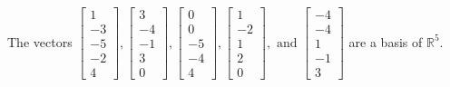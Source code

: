\begin{exercise}
\begin{exerciseStatement}
  \end{exerciseStatement}
  \begin{exerciseAnswer}
   The vectors \(\left[\begin{array}{r}
1 \\
-3 \\
-5 \\
-2 \\
4
\end{array}\right] , \left[\begin{array}{r}
3 \\
-4 \\
-1 \\
3 \\
0
\end{array}\right] , \left[\begin{array}{r}
0 \\
0 \\
-5 \\
-4 \\
4
\end{array}\right] , \left[\begin{array}{r}
1 \\
-2 \\
1 \\
2 \\
0
\end{array}\right] , \text{ and } \left[\begin{array}{r}
-4 \\
-4 \\
1 \\
-1 \\
3
\end{array}\right]\) 
  	 are  a basis of \(\mathbb{R}^5\).
  


  \end{exerciseAnswer}
\end{exercise}